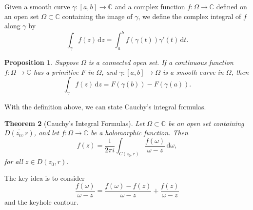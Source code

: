 \documentclass{article}
\newtheorem{theorem}{Theorem}[section]
\newtheorem{proposition}[theorem]{Proposition}
\theoremstyle{definition}
\newcommand{\C}{\mathbb{C}}
\newcommand{\dd}{\mathrm{d}}
\begin{document}
Given a smooth curve \(\gamma\colon[a,b]\to\C\) and a complex function \(f\colon\Omega\to\C\) defined on an open set \(\Omega\subset\C\) containing the image of \(\gamma\), we define the complex integral of \(f\) along \(\gamma\) by
\begin{equation*}
    \int_{\gamma} f(z)\, \dd z = \int_a^b f(\gamma(t)) \gamma'(t)\, \dd t.
\end{equation*}
\begin{proposition}\label{homotopic prop}
Suppose $\Omega$ is a connected open set. If a continuous function \(f\colon\Omega\to\C\) has a primitive $F$ in \(\Omega\), and \(\gamma\colon[a,b]\to\Omega\) is a smooth curve in \(\Omega\), then
\begin{equation*}
    \int_{\gamma} f(z)\, \dd z = F(\gamma(b)) - F(\gamma(a)).
\end{equation*}
\end{proposition}
With the definition above, we can state Cauchy's integral formulas.
\begin{theorem}[Cauchy's Integral Formulas]\label{th:cauchy_integral_formula}
Let \(\Omega\subset\C\) be an open set containing $\overline{D(z_0,r)}$, and let \(f\colon\Omega\to\C\) be a holomorphic function. Then
\begin{equation*}
    f(z) = \frac{1}{2\pi i} \int_{C(z_0,r)} \frac{f(\omega)}{\omega-z}\, \dd \omega,
\end{equation*}
for all $z\in D(z_0,r)$.
\end{theorem}
The key idea is to consider \[\frac{f(\omega)}{\omega - z}=\frac{f(\omega)-f(z)}{\omega - z}+\frac{f(z)}{\omega - z} \]
and the keyhole contour.
\end{document}

